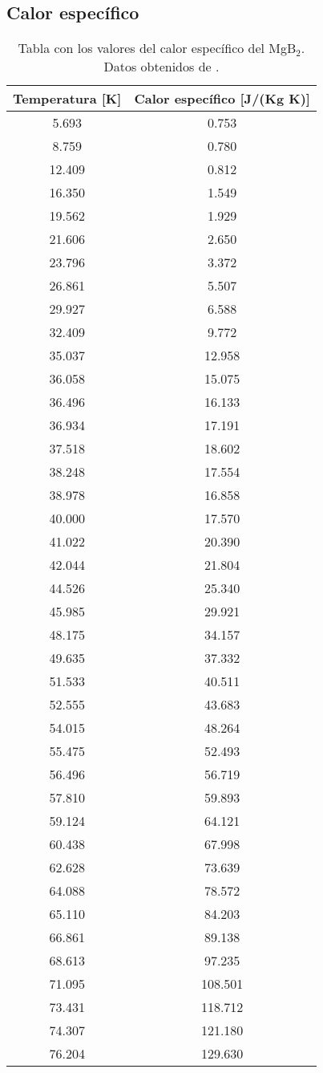 \subsection*{Calor específico}
\begin{table}[h!]
  \vspace{-0.5cm}
  \centering
  \begin{tabular}{|c|c|}\hline
  	Temperatura [K]	&	Calor específico [J/(Kg K)]	\\ \hline
  	5.693	&	0.753	\\
	8.759	&	0.780	\\
	12.409	&	0.812	\\
	16.350	&	1.549	\\
	19.562	&	1.929	\\
	21.606	&	2.650	\\
	23.796	&	3.372	\\
	26.861	&	5.507	\\
	29.927	&	6.588	\\
	32.409	&	9.772	\\
	35.037	&	12.958	\\
	36.058	&	15.075	\\
	36.496	&	16.133	\\
	36.934	&	17.191	\\
	37.518	&	18.602	\\
	38.248	&	17.554	\\
	38.978	&	16.858	\\
	40.000	&	17.570	\\
	41.022	&	20.390	\\
	42.044	&	21.804	\\
	44.526	&	25.340	\\
	45.985	&	29.921	\\
	48.175	&	34.157	\\
	49.635	&	37.332	\\
	51.533	&	40.511	\\
	52.555	&	43.683	\\
	54.015	&	48.264	\\
	55.475	&	52.493	\\
	56.496	&	56.719	\\
	57.810	&	59.893	\\
	59.124	&	64.121	\\
	60.438	&	67.998	\\
	62.628	&	73.639	\\
	64.088	&	78.572	\\
	65.110	&	84.203	\\
	66.861	&	89.138	\\
	68.613	&	97.235	\\
	71.095	&	108.501	\\
	73.431	&	118.712	\\
	74.307	&	121.180	\\
	76.204	&	129.630	\\ \hline
  \end{tabular}
  \caption[Tabla con los valores del calor específico del MgB$_2$]{Tabla con los valores del calor específico del MgB$_2$. Datos obtenidos de \cite{Bauer2001}.}
  \label{tab:cmgb2}
\end{table}

